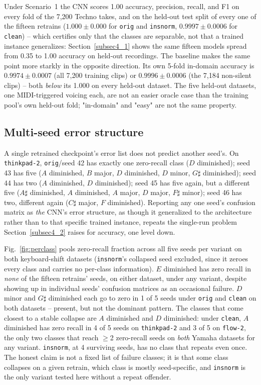 \documentclass[pdflatex,sn-mathphys-num,iicol]{sn-jnl}
\theoremstyle{thmstyleone}
\theoremstyle{thmstyletwo}
\theoremstyle{thmstylethree}
\begin{document}
Under Scenario~1 the CNN scores 1.00 accuracy, precision, recall, and F1 on every fold of the 7{,}200 Techno takes, and on the held-out test split of every one of the fifteen retrains ($1.000\pm0.000$ for \texttt{orig} and \texttt{insnorm}, $0.9997\pm0.0006$ for \texttt{clean}) -- which certifies only that the classes are separable, not that a trained instance generalizes: Section~\ref{subsec4_1} shows the same fifteen models spread from 0.35 to 1.00 accuracy on held-out recordings. The baseline makes the same point more starkly in the opposite direction. Its own 5-fold in-domain accuracy is $0.9974\pm0.0007$ (all 7{,}200 training clips) or $0.9996\pm0.0006$ (the 7{,}184 non-silent clips) -- both \emph{below} its 1.000 on every held-out dataset. The five held-out datasets, one MIDI-triggered voicing each, are not an easier oracle case than the training pool's own held-out fold; "in-domain" and "easy" are not the same property.

\subsection{Multi-seed error structure}\label{subsec4_3}

A single retrained checkpoint's error list does not predict another seed's. On \texttt{thinkpad-2}, \texttt{orig}/seed 42 has exactly one zero-recall class ($D$ diminished); seed 43 has five ($A$ diminished, $B$ major, $D$ diminished, $D$ minor, $G\sharp$ diminished); seed 44 has two ($A$ diminished, $D$ diminished); seed 45 has five again, but a different five ($A\sharp$ diminished, $A$ diminished, $A$ major, $D$ major, $F\sharp$ minor); seed 46 has two, different again ($C\sharp$ major, $F$ diminished). Reporting any one seed's confusion matrix as \emph{the} CNN's error structure, as though it generalized to the architecture rather than to that specific trained instance, repeats the single-run problem Section~\ref{subsec4_2} raises for accuracy, one level down.

Fig.~\ref{fig:perclass} pools zero-recall fraction across all five seeds per variant on both keyboard-shift datasets (\texttt{insnorm}'s collapsed seed excluded, since it zeroes every class and carries no per-class information). $E$ diminished has zero recall in \emph{none} of the fifteen retrains' seeds, on either dataset, under any variant, despite showing up in individual seeds' confusion matrices as an occasional failure. $D$ minor and $G\sharp$ diminished each go to zero in 1 of 5 seeds under \texttt{orig} and \texttt{clean} on both datasets -- present, but not the dominant pattern. The classes that come closest to a stable collapse are $A$ diminished and $D$ diminished: under \texttt{clean}, $A$ diminished has zero recall in 4 of 5 seeds on \texttt{thinkpad-2} and 3 of 5 on \texttt{flow-2}, the only two classes that reach $\geq$2 zero-recall seeds on \emph{both} Yamaha datasets for any variant. \texttt{insnorm}, at 4 surviving seeds, has no class that repeats even once. The honest claim is not a fixed list of failure classes; it is that some class collapses on a given retrain, which class is mostly seed-specific, and \texttt{insnorm} is the only variant tested here without a repeat offender.
\end{document}
